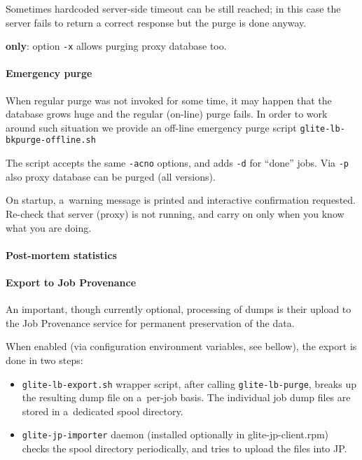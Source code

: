 Sometimes hardcoded server-side timeout can be still reached; in this case the
server fails to return a correct response but the purge is done anyway. 

\textbf{\LBnew only}: option \verb'-x' allows purging \LB proxy database too.

\paragraph{Emergency purge}

When regular purge was not invoked for some time, it may happen that 
the database grows huge and the regular (on-line) purge fails.
In order to work around such situation we provide an off-line emergency
purge script \verb'glite-lb-bkpurge-offline.sh'

The script accepts the same \verb'-acno' options, and adds \verb'-d' for ``done'' jobs. 
Via \verb'-p' also \LB proxy database can be purged (all \LB versions).

On startup, a~warning message is printed and interactive confirmation
requested.
Re-check that \LB server (proxy) is not running, and carry on only when you
know what you are doing.

\paragraph{Post-mortem statistics}


\paragraph{Export to Job Provenance}

An important, though currently optional, processing of \LB dumps
is their upload to the Job Provenance service for permanent preservation
of the data.


When enabled (via configuration environment variables, see bellow), 
the export is done in two steps:
\begin{itemize}
\item \verb'glite-lb-export.sh' wrapper script, after calling \verb'glite-lb-purge', breaks up the resulting dump file on a~per-job basis.
The individual job dump files are stored in a~dedicated spool directory.
\item \verb'glite-jp-importer' daemon (installed optionally in glite-jp-client.rpm) checks the spool directory periodically,
and tries to upload the files into JP.
\end{itemize}

